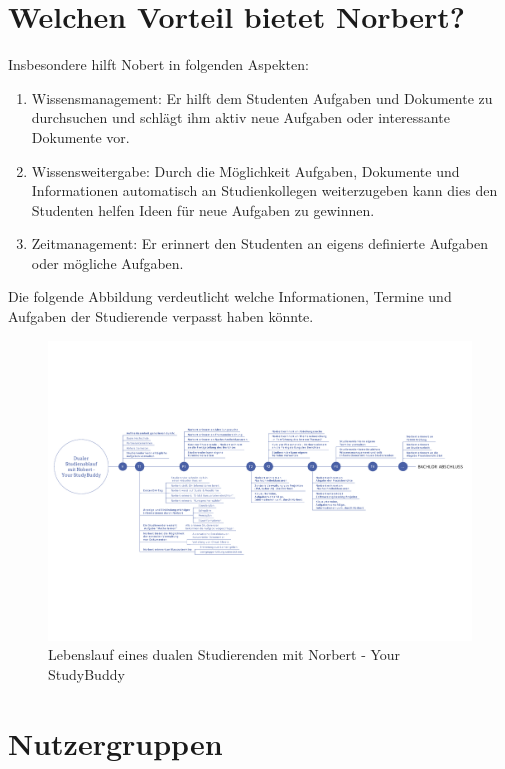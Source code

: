 \section{Welchen Vorteil bietet Norbert?}
Insbesondere hilft Nobert in folgenden Aspekten:
\begin{enumerate}
	\item Wissensmanagement: Er hilft dem Studenten Aufgaben und Dokumente zu durchsuchen und schlägt ihm aktiv neue Aufgaben oder interessante Dokumente vor.
	\item Wissensweitergabe: Durch die Möglichkeit Aufgaben, Dokumente und Informationen automatisch an Studienkollegen weiterzugeben kann dies den Studenten helfen Ideen für neue Aufgaben zu gewinnen.
	\item Zeitmanagement: Er erinnert den Studenten an eigens definierte Aufgaben oder mögliche Aufgaben.
\end{enumerate}

Die folgende Abbildung verdeutlicht welche Informationen, Termine und Aufgaben der Studierende verpasst haben könnte. 

\begin{landscape}
\vspace*{35mm}
	\begin{figure}[H]
	\centering
	\includegraphics[scale=0.75]{images/timeline.pdf}
	\caption{Lebenslauf eines dualen Studierenden mit Norbert - Your StudyBuddy}
	\end{figure}
	
\end{landscape}
\newpage

\section{Nutzergruppen}

